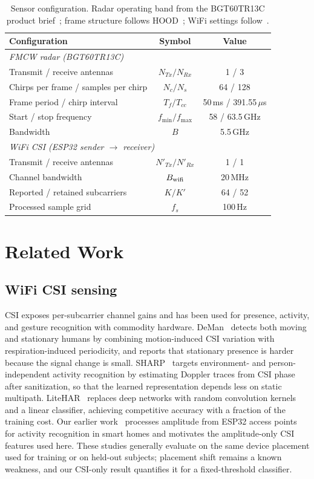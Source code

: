 \documentclass[conference,10pt,letterpaper]{IEEEtran}
\begin{document}
\begin{table}[!b]
\centering\footnotesize
\setlength{\tabcolsep}{3.5pt}
\caption{Sensor configuration. Radar operating band from the BGT60TR13C product brief~\cite{bgt60}; frame structure follows HOOD~\cite{hood}; WiFi settings follow~\cite{wifi}.}
\label{tab:radar}
\begin{tabular}{lcc}\toprule
Configuration & Symbol & Value\\\midrule
\multicolumn{3}{l}{\itshape FMCW radar (BGT60TR13C)}\\
Transmit / receive antennas & $N_{Tx}/N_{Rx}$ & 1 / 3\\
Chirps per frame / samples per chirp & $N_c/N_s$ & 64 / 128\\
Frame period / chirp interval & $T_f/T_{cc}$ & 50\,ms / 391.55\,$\mu$s\\
Start / stop frequency & $f_{\min}/f_{\max}$ & 58 / 63.5\,GHz\\
Bandwidth & $B$ & 5.5\,GHz\\\midrule
\multicolumn{3}{l}{\itshape WiFi CSI (ESP32 sender $\to$ receiver)}\\
Transmit / receive antennas & $N'_{Tx}/N'_{Rx}$ & 1 / 1\\
Channel bandwidth & $B_{\rm wifi}$ & 20\,MHz\\
Reported / retained subcarriers & $K/K'$ & 64 / 52\\
Processed sample grid & $f_s$ & 100\,Hz\\\bottomrule
\end{tabular}
\end{table}

\section{Related Work}\label{sec:related}
\subsection{WiFi CSI sensing}
CSI exposes per-subcarrier channel gains and has been used for presence, activity, and gesture recognition with commodity hardware. DeMan~\cite{deman} detects both moving and stationary humans by combining motion-induced CSI variation with respiration-induced periodicity, and reports that stationary presence is harder because the signal change is small. SHARP~\cite{sharp} targets environment- and person-independent activity recognition by estimating Doppler traces from CSI phase after sanitization, so that the learned representation depends less on static multipath. LiteHAR~\cite{litehar} replaces deep networks with random convolution kernels and a linear classifier, achieving competitive accuracy with a fraction of the training cost. Our earlier work~\cite{wifi} processes amplitude from ESP32 access points for activity recognition in smart homes and motivates the amplitude-only CSI features used here. These studies generally evaluate on the same device placement used for training or on held-out subjects; placement shift remains a known weakness, and our CSI-only result quantifies it for a fixed-threshold classifier.
\end{document}
